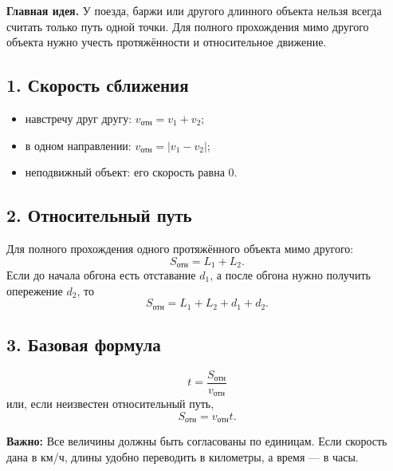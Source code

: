\documentclass[a4paper,12pt]{article}
\newcommand{\key}[1]{\textbf{\color{darkaccent}#1}}
\newcommand{\warn}[1]{\textbf{\color{accent}Важно:} #1}
\begin{document}
\key{Главная идея.} У поезда, баржи или другого длинного объекта нельзя всегда считать только путь одной точки. Для полного прохождения мимо другого объекта нужно учесть протяжённости и относительное движение.

\subsection*{1. Скорость сближения}
\begin{itemize}
  \item навстречу друг другу: $v_{\text{отн}}=v_1+v_2$;
  \item в одном направлении: $v_{\text{отн}}=|v_1-v_2|$;
  \item неподвижный объект: его скорость равна $0$.
\end{itemize}

\subsection*{2. Относительный путь}
Для полного прохождения одного протяжённого объекта мимо другого:
\[
S_{\text{отн}}=L_1+L_2.
\]
Если до начала обгона есть отставание $d_1$, а после обгона нужно получить опережение $d_2$, то
\[
S_{\text{отн}}=L_1+L_2+d_1+d_2.
\]

\subsection*{3. Базовая формула}
\[
\boxed{t=\frac{S_{\text{отн}}}{v_{\text{отн}}}}
\]
или, если неизвестен относительный путь,
\[
S_{\text{отн}}=v_{\text{отн}}t.
\]

\warn{Все величины должны быть согласованы по единицам. Если скорость дана в км/ч, длины удобно переводить в километры, а время --- в часы.}

\begin{center}
\end{center}
\end{document}
